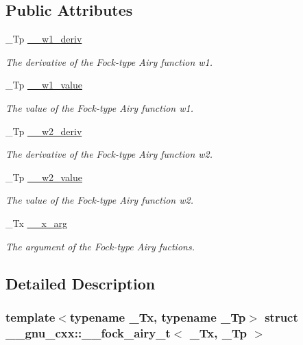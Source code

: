 \subsection*{Public Attributes}
\begin{DoxyCompactItemize}
\item 
\+\_\+\+Tp \hyperlink{struct____gnu__cxx_1_1____fock__airy__t_a10282e35a955f37373aa5bbe45bc4531}{\+\_\+\+\_\+w1\+\_\+deriv}
\begin{DoxyCompactList}\small\item\em The derivative of the Fock-\/type Airy function w1. \end{DoxyCompactList}\item 
\+\_\+\+Tp \hyperlink{struct____gnu__cxx_1_1____fock__airy__t_a26faefea72b5ae8bb06578a9f7eaa66d}{\+\_\+\+\_\+w1\+\_\+value}
\begin{DoxyCompactList}\small\item\em The value of the Fock-\/type Airy function w1. \end{DoxyCompactList}\item 
\+\_\+\+Tp \hyperlink{struct____gnu__cxx_1_1____fock__airy__t_abcd255990d6386453d48c5fbef224e26}{\+\_\+\+\_\+w2\+\_\+deriv}
\begin{DoxyCompactList}\small\item\em The derivative of the Fock-\/type Airy function w2. \end{DoxyCompactList}\item 
\+\_\+\+Tp \hyperlink{struct____gnu__cxx_1_1____fock__airy__t_a305b6edec1ae08bcbc3b486720410283}{\+\_\+\+\_\+w2\+\_\+value}
\begin{DoxyCompactList}\small\item\em The value of the Fock-\/type Airy function w2. \end{DoxyCompactList}\item 
\+\_\+\+Tx \hyperlink{struct____gnu__cxx_1_1____fock__airy__t_a383d76e48d9f70a90cab2cb8a2f1032d}{\+\_\+\+\_\+x\+\_\+arg}
\begin{DoxyCompactList}\small\item\em The argument of the Fock-\/type Airy fuctions. \end{DoxyCompactList}\end{DoxyCompactItemize}


\subsection{Detailed Description}
\subsubsection*{template$<$typename \+\_\+\+Tx, typename \+\_\+\+Tp$>$\newline
struct \+\_\+\+\_\+gnu\+\_\+cxx\+::\+\_\+\+\_\+fock\+\_\+airy\+\_\+t$<$ \+\_\+\+Tx, \+\_\+\+Tp $>$}

